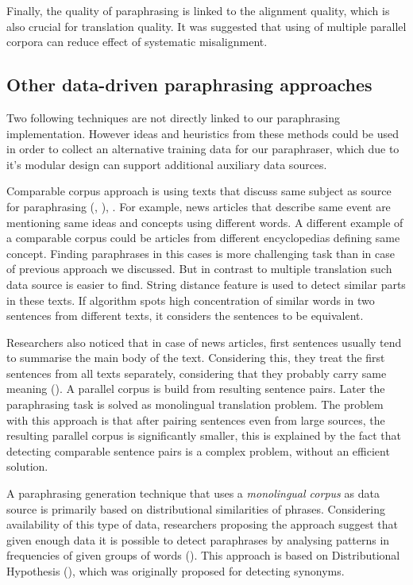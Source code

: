 Finally, the quality of paraphrasing is linked to the alignment quality, which is also crucial for translation quality. It was suggested that using of multiple parallel corpora can reduce effect of systematic misalignment.

\subsection{Other data-driven paraphrasing approaches}

Two following techniques are not directly linked to our paraphrasing implementation. However ideas and heuristics from these methods could be used in order to collect an alternative training data for our paraphraser, which due to it's modular design can support additional auxiliary data sources.  

Comparable corpus approach is using texts that discuss same subject as source for paraphrasing (\cite{dolan2004unsupervised}, \cite{dolan2005automatically}), . For example, news articles that describe same event are mentioning same ideas and concepts using different words. A different example of a comparable corpus could be articles from different encyclopedias defining same concept. Finding paraphrases in this cases is more challenging task than in case of previous approach we discussed. But in contrast to multiple translation such data source is easier to find. String distance feature is used to detect similar parts in these texts. If algorithm spots high concentration of similar words in two sentences from different texts, it considers the sentences to be equivalent. 

Researchers also noticed that in case of news articles, first sentences usually tend to summarise the main body of the text. Considering this, they treat the first sentences from all texts separately, considering that they probably carry same meaning (\cite{dolan2005automatically}). A parallel corpus is build from resulting sentence pairs. Later the paraphrasing task is solved as monolingual translation problem. The problem with this approach is that after pairing sentences even from large sources, the resulting parallel corpus is significantly smaller, this is explained by the fact that detecting comparable sentence pairs is a complex problem, without an efficient solution.

A paraphrasing generation technique that uses a \textit{monolingual corpus} as data source is primarily based on distributional similarities of phrases. Considering availability of this type of data, researchers proposing the approach suggest that given enough data it is possible to detect paraphrases by analysing patterns in frequencies of given groups of words (\cite{lin2001dirt}). This approach is based on Distributional Hypothesis (\cite{harris1954distributional}), which was originally proposed for detecting synonyms.


